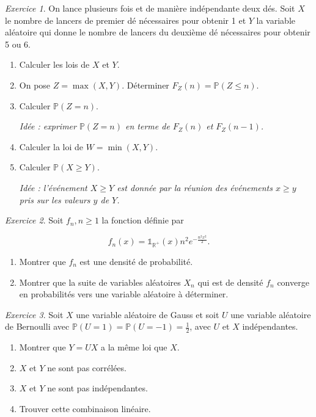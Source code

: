 \documentclass[french]{book}
\theoremstyle{definition}
\theoremstyle{remark}
\newtheorem{exo}{Exercice}
\begin{document}
\begin{exo}
  On lance plusieurs fois et de manière indépendante deux dés. Soit \(X\) le nombre de lancers de premier dé nécessaires pour obtenir 1 et \(Y\) la variable aléatoire qui donne le nombre de lancers du deuxième dé nécessaires pour obtenir 5 ou 6.

  \begin{enumerate}
    \item Calculer les lois de \(X\) et \(Y\).
    \item On pose \(Z  = \max(X,Y)\). Déterminer \(F_Z(n) = \mathbb{P}(Z \leq n)\).
    \item Calculer \(\mathbb{P}(Z =n)\).

    \emph{Idée : exprimer \(\mathbb{P}(Z = n)\) en terme de \(F_Z(n)\) et \(F_Z(n-1)\).}

    \item Calculer la loi de \(W = \min(X,Y)\).
    \item Calculer \(\mathbb{P}(X \geq Y)\).

    \emph{Idée : l'événement \(X \geq  Y\) est donnée par la réunion des événements \(x \geq y\) pris sur les valeurs \(y\) de \(Y\).}
  \end{enumerate}
\end{exo}

\begin{exo}
  Soit \(f_n, n \geq 1\) la fonction définie par

  \[f_n(x) = \mathds{1}_{\mathbb{R}^{+}}(x)n ^2 e^{-\frac{n ^2 x ^2}{2}}.\]

  \begin{enumerate}
    \item Montrer que \(f_n\) est une densité de probabilité.
    \item Montrer que la suite de variables aléatoires \(X_n\) qui est de densité \(f_n\) converge en probabilités vers une variable aléatoire à déterminer.
  \end{enumerate}
\end{exo}

\begin{exo}
  Soit \(X\) une variable aléatoire de Gauss et soit \(U\) une variable aléatoire de Bernoulli avec \(\mathbb{P}(U = 1) = \mathbb{P}(U = -1) = \displaystyle\frac{1}{2}\), avec \(U\) et \(X\) indépendantes.

  \begin{enumerate}
    \item Montrer que \(Y = UX\) a la même loi que \(X\).
    \item \(X\) et \(Y\) ne sont pas corrélées.
    \item \(X\) et \(Y\) ne sont pas indépendantes.
    \item Trouver cette combinaison linéaire.
  \end{enumerate}
\end{exo}
\end{document}
